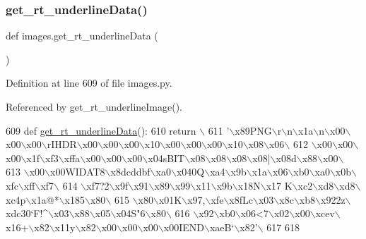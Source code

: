 \subsubsection{\texorpdfstring{get\+\_\+rt\+\_\+underline\+Data()}{get\_rt\_underlineData()}}
{\footnotesize\ttfamily def images.\+get\+\_\+rt\+\_\+underline\+Data (\begin{DoxyParamCaption}{ }\end{DoxyParamCaption})}



Definition at line 609 of file images.\+py.



Referenced by get\+\_\+rt\+\_\+underline\+Image().


\begin{DoxyCode}
609 \textcolor{keyword}{def }\hyperlink{namespaceimages_a016500491499878fd6993077288fadc0}{get\_rt\_underlineData}():
610     \textcolor{keywordflow}{return} \(\backslash\)
611 \textcolor{stringliteral}{'\(\backslash\)x89PNG\(\backslash\)r\(\backslash\)n\(\backslash\)x1a\(\backslash\)n\(\backslash\)x00\(\backslash\)x00\(\backslash\)x00\(\backslash\)rIHDR\(\backslash\)x00\(\backslash\)x00\(\backslash\)x00\(\backslash\)x10\(\backslash\)x00\(\backslash\)x00\(\backslash\)x00\(\backslash\)x10\(\backslash\)x08\(\backslash\)x06\(\backslash\)}
612 \textcolor{stringliteral}{\(\backslash\)x00\(\backslash\)x00\(\backslash\)x00\(\backslash\)x1f\(\backslash\)xf3\(\backslash\)xffa\(\backslash\)x00\(\backslash\)x00\(\backslash\)x00\(\backslash\)x04sBIT\(\backslash\)x08\(\backslash\)x08\(\backslash\)x08\(\backslash\)x08|\(\backslash\)x08d\(\backslash\)x88\(\backslash\)x00\(\backslash\)}
613 \textcolor{stringliteral}{\(\backslash\)x00\(\backslash\)x00WIDAT8\(\backslash\)x8dcddbf\(\backslash\)xa0\(\backslash\)x040Q\(\backslash\)xa4\(\backslash\)x9b\(\backslash\)x1a\(\backslash\)x06\(\backslash\)xb0\(\backslash\)xa0\(\backslash\)x0b\(\backslash\)xfc\(\backslash\)xff\(\backslash\)xf7\(\backslash\)}
614 \textcolor{stringliteral}{\(\backslash\)xf7?2\(\backslash\)x9f\(\backslash\)x91\(\backslash\)x89\(\backslash\)x99\(\backslash\)x11\(\backslash\)x9b\(\backslash\)x18N\(\backslash\)x17 K\(\backslash\)xc2\(\backslash\)xd8\(\backslash\)xd8\(\backslash\)xc4p\(\backslash\)x1a@*\(\backslash\)x185\(\backslash\)x80\(\backslash\)}
615 \textcolor{stringliteral}{\(\backslash\)x80\(\backslash\)x01K\(\backslash\)x97,\(\backslash\)xfe\(\backslash\)x8fLc\(\backslash\)x03\(\backslash\)x8c\(\backslash\)xb8\(\backslash\)x922z\(\backslash\)xdc30`F!^\(\backslash\)x03\(\backslash\)x88\(\backslash\)x05\(\backslash\)x04S"6\(\backslash\)x80\(\backslash\)}
616 \textcolor{stringliteral}{\(\backslash\)x92\(\backslash\)xb0\(\backslash\)x06<7\(\backslash\)x02\(\backslash\)x00\(\backslash\)xcev\(\backslash\)x16+\(\backslash\)x82\(\backslash\)x11y\(\backslash\)x82\(\backslash\)x00\(\backslash\)x00\(\backslash\)x00\(\backslash\)x00IEND\(\backslash\)xaeB`\(\backslash\)x82'}\(\backslash\)
617 
618 
\end{DoxyCode}
\mbox{\label{namespaceimages_ac79f659a15f37cc800164b1aa57da45a}} 
